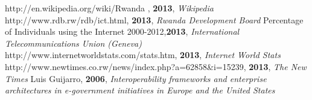 \begin{thebibliography}{99}
http://en.wikipedia.org/wiki/Rwanda , {\bfseries 2013}, {\itshape Wikipedia}
http://www.rdb.rw/rdb/ict.html, {\bfseries 2013}, {\itshape Rwanda Development Board}
Percentage of Individuals using the Internet 2000-2012,{\bfseries 2013}, {\itshape International Telecommunications Union (Geneva)}
http://www.internetworldstats.com/stats.htm, {\bfseries 2013}, {\itshape Internet World Stats}
http://www.newtimes.co.rw/news/index.php?a=62858\&i=15239, {\bfseries 2013}, {\itshape The New Times}
Luis Guijarro, {\bfseries 2006}, {\itshape Interoperability frameworks and enterprise architectures in e-government initiatives in Europe and the United States}
\end{thebibliography}
